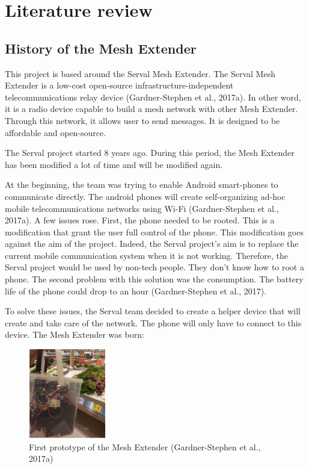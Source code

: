 \chapter{Literature review}

\section{History of the Mesh Extender}

This project is based around the Serval Mesh Extender. The Serval Mesh Extender is a low-cost open-source infrastructure-independent telecommunications relay device (Gardner-Stephen et al., 2017a). In other word, it is a radio device capable to build a mesh network with other Mesh Extender. Through this network, it allows user to send messages. It is designed to be affordable and open-source.

The Serval project started 8 years ago. During this period, the Mesh Extender has been modified a lot of time and will be modified again.

At the beginning, the team was trying to enable Android smart-phones to communicate directly. The android phones will create self-organizing ad-hoc mobile telecommunications networks using Wi-Fi (Gardner-Stephen et al., 2017a). A few issues rose. First, the phone needed to be rooted. This is a modification that grant the user full control of the phone. This modification goes against the aim of the project. Indeed, the Serval project's aim is to replace the current mobile communication system  when it is not working. Therefore, the Serval project would be used by non-tech people. They don't know how to root a phone.
The second problem with this solution was the consumption. The battery life of the phone could drop to an hour (Gardner-Stephen et al., 2017).

To solve these issues, the Serval team decided to create a helper device that will create and take care of the network. The phone will only have to connect to this device. The Mesh Extender was born:

\begin{figure}[H]
\begin{center}
\includegraphics[width=0.3\textwidth]{image/meshextenderproto1.png}%
\caption{First prototype of the Mesh Extender (Gardner-Stephen et al., 2017a)}%
\label{figure:protoMesh}%
\end{center}
\end{figure}



